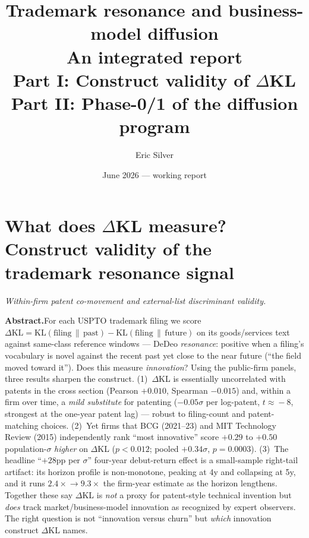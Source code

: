 \documentclass[11pt]{report}
\title{\bfseries Trademark resonance and business-model diffusion\\
\large An integrated report \\[0.3em]
\normalsize Part I: Construct validity of $\Delta$KL \quad\textbar\quad Part II: Phase-0/1 of the diffusion program}
\author{Eric Silver}
\date{June 2026 --- working report}
\newcommand{\dkl}{$\Delta$KL}
\begin{document}
\maketitle
\tableofcontents
\clearpage

\chapter{What does \dkl{} measure? Construct validity of the trademark resonance signal}
\noindent\textit{Within-firm patent co-movement and external-list discriminant validity.}\medskip

\noindent\textbf{Abstract.}\quad For each USPTO trademark filing we score
$\Delta\mathrm{KL}=\mathrm{KL}(\text{filing}\,\|\,\text{past})-\mathrm{KL}(\text{filing}\,\|\,\text{future})$
on its goods/services text against same-class reference windows --- DeDeo
\emph{resonance}: positive when a filing's vocabulary is novel against the recent
past yet close to the near future (``the field moved toward it''). Does this
measure \emph{innovation}? Using the public-firm panels, three results sharpen
the construct. (1)~\dkl{} is essentially uncorrelated with patents in the cross
section (Pearson $+0.010$, Spearman $-0.015$) and, within a firm over time, a
\emph{mild substitute} for patenting ($-0.05\sigma$ per log-patent, $t\!\approx\!-8$,
strongest at the one-year patent lag) --- robust to filing-count and patent-matching
choices. (2)~Yet firms that BCG (2021--23) and MIT Technology Review (2015)
independently rank ``most innovative'' score $+0.29$ to $+0.50$ population-$\sigma$
\emph{higher} on \dkl{} ($p<0.012$; pooled $+0.34\sigma$, $p=0.0003$). (3)~The
headline ``$+28$pp per $\sigma$'' four-year debut-return effect is a small-sample
right-tail artifact: its horizon profile is non-monotone, peaking at 4y and
collapsing at 5y, and it runs $2.4\times\!\to\!9.3\times$ the firm-year estimate as
the horizon lengthens. Together these say \dkl{} is \emph{not} a proxy for
patent-style technical invention but \emph{does} track market/business-model
innovation as recognized by expert observers. The right question is not
``innovation versus churn'' but \emph{which} innovation construct \dkl{} names.
\end{document}
